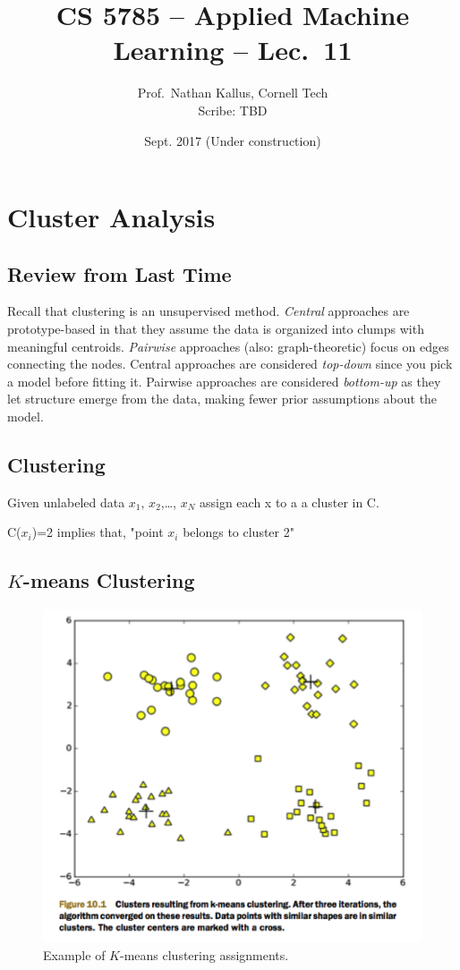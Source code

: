 \documentclass[a4paper]{article}
\title{CS 5785 -- Applied Machine Learning -- Lec.\ 11}
\author{Prof.\ Nathan Kallus, Cornell Tech\\Scribe: TBD}
\date{Sept. 2017 (Under construction)}
\begin{document}
\maketitle

\section{Cluster Analysis}

\subsection{Review from Last Time}

Recall that clustering is an unsupervised method.  
\emph{Central} approaches are prototype-based in that they assume the data is organized into clumps with meaningful centroids.  
\emph{Pairwise} approaches (also: graph-theoretic) focus on edges connecting the nodes.  
Central approaches are considered \emph{top-down} since you pick a model before fitting it.  
Pairwise approaches are considered \emph{bottom-up} as they let structure emerge from the data, making fewer prior assumptions about the model.

\subsection{Clustering}
Given unlabeled data $x_{1}$, $x_{2}$,\ldots, $x_{N}$ assign each x to a a cluster in C.

C($x_{i}$)=2  implies that, "point $x_{i}$ belongs to cluster 2"


\subsection{$K$-means Clustering}
\begin{figure}
\centering
\includegraphics[width=1.0\textwidth]{fig10_1.png}
\caption{\label{fig:kmeans}Example of $K$-means clustering assignments.}
\end{figure}
\end{document}
